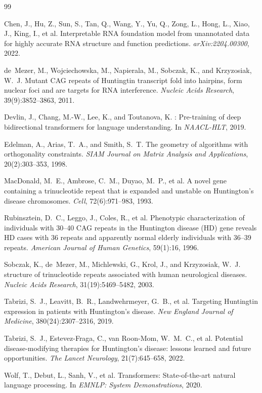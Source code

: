 \documentclass[11pt]{article}
\begin{document}
\begin{thebibliography}{99}

Chen, J., Hu, Z., Sun, S., Tan, Q., Wang, Y., Yu, Q., Zong, L., Hong, L., Xiao, J., King, I., et al.
\newblock Interpretable RNA foundation model from unannotated data for highly accurate RNA structure and function predictions.
\newblock \emph{arXiv:2204.00300}, 2022.

de~Mezer, M., Wojciechowska, M., Napierala, M., Sobczak, K., and Krzyzosiak, W.~J.
\newblock Mutant {CAG} repeats of {Huntingtin} transcript fold into hairpins, form nuclear foci and are targets for {RNA} interference.
\newblock \emph{Nucleic Acids Research}, 39(9):3852--3863, 2011.

Devlin, J., Chang, M.-W., Lee, K., and Toutanova, K.
: Pre-training of deep bidirectional transformers for language understanding.
\newblock In \emph{NAACL-HLT}, 2019.

Edelman, A., Arias, T.~A., and Smith, S.~T.
\newblock The geometry of algorithms with orthogonality constraints.
\newblock \emph{SIAM Journal on Matrix Analysis and Applications}, 20(2):303--353, 1998.

MacDonald, M.~E., Ambrose, C.~M., Duyao, M.~P., et al.
\newblock A novel gene containing a trinucleotide repeat that is expanded and unstable on {Huntington's} disease chromosomes.
\newblock \emph{Cell}, 72(6):971--983, 1993.

Rubinsztein, D.~C., Leggo, J., Coles, R., et al.
\newblock Phenotypic characterization of individuals with 30--40 {CAG} repeats in the {Huntington} disease ({HD}) gene reveals {HD} cases with 36 repeats and apparently normal elderly individuals with 36--39 repeats.
\newblock \emph{American Journal of Human Genetics}, 59(1):16, 1996.

Sobczak, K., de~Mezer, M., Michlewski, G., Krol, J., and Krzyzosiak, W.~J.
 structure of trinucleotide repeats associated with human neurological diseases.
\newblock \emph{Nucleic Acids Research}, 31(19):5469--5482, 2003.

Tabrizi, S.~J., Leavitt, B.~R., Landwehrmeyer, G.~B., et al.
\newblock Targeting {Huntingtin} expression in patients with {Huntington's} disease.
\newblock \emph{New England Journal of Medicine}, 380(24):2307--2316, 2019.

Tabrizi, S.~J., Estevez-Fraga, C., van Roon-Mom, W.~M.~C., et al.
\newblock Potential disease-modifying therapies for {Huntington's} disease: lessons learned and future opportunities.
\newblock \emph{The Lancet Neurology}, 21(7):645--658, 2022.

Wolf, T., Debut, L., Sanh, V., et al.
\newblock Transformers: State-of-the-art natural language processing.
\newblock In \emph{EMNLP: System Demonstrations}, 2020.

\end{thebibliography}
\end{document}
